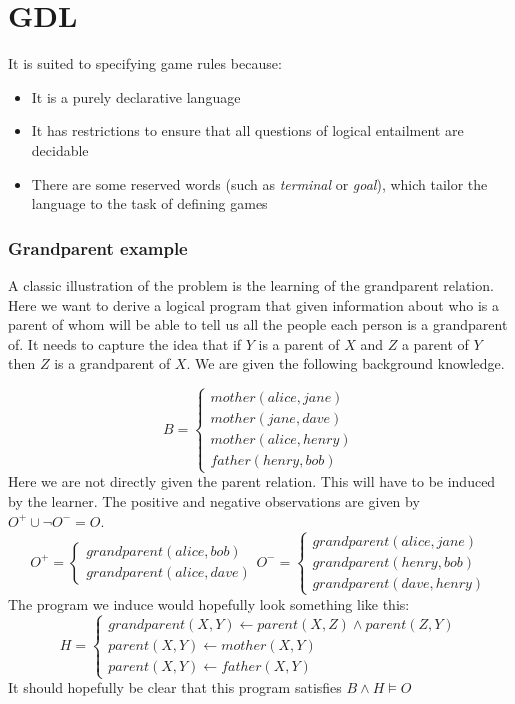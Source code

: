 \section{GDL}

It is suited to specifying game rules because:
\begin{itemize}
	\item It is a purely declarative language
	\item It has restrictions to ensure that all questions of logical entailment are decidable
	\item There are some reserved words (such as \textit{terminal} or \textit{goal}), which tailor the language to the task of defining games
\end{itemize}




\subsubsection{Grandparent example}
A classic illustration of the problem is the learning of the grandparent relation. Here we want to derive a logical program that given information about who is a parent of whom will be able to tell us all the people each person is a grandparent of. It needs to capture the idea that if $Y$ is a parent of $X$ and $Z$ a parent of $Y$ then $Z$ is a grandparent of $X$. We are given the following background knowledge.

\[
B=
\begin{cases}
mother(alice,jane)\\
mother(jane,dave)\\
mother(alice,henry)\\
father(henry,bob)
\end{cases}
\]
Here we are not directly given the parent relation. This will have to be induced by the learner. The positive and negative observations are given by $O^+ \cup \neg O^- = O$.
\[
O^+=
\begin{cases}
grandparent(alice,bob)\\
grandparent(alice,dave)
\end{cases}
O^-=
\begin{cases}
grandparent(alice,jane)\\
grandparent(henry,bob)\\
grandparent(dave,henry)
\end{cases}
\]
The program we induce would hopefully look something like this:
\[H=\begin{cases}
grandparent(X,Y) \leftarrow parent(X,Z) \wedge parent(Z,Y)\\
parent(X,Y) \leftarrow mother(X,Y)\\
parent(X,Y) \leftarrow father(X,Y)
\end{cases}\]
It should hopefully be clear that this program satisfies $B \wedge H \vDash O$

